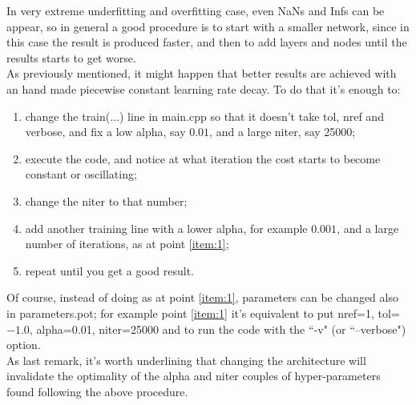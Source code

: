 \documentclass[12pt, a4paper]{report}
\theoremstyle{definition}
\begin{document}
In very extreme underfitting and overfitting case, even NaNs and Infs can be appear, so in general a good procedure is to start with a smaller network, since in this case the result is produced faster, and then to add layers and nodes until the results starts to get worse.\\
\newline\noindent As previously mentioned, it might happen that better results are achieved with an hand made piecewise constant learning rate decay. To do that it's enough to:
\begin{enumerate}
	\item\label{item:1} change the {\ttfamily train(...)} line in main.cpp so that it doesn't take {\ttfamily tol, nref} and {\ttfamily verbose}, and fix a low {\ttfamily alpha}, say $0.01$, and a large {\ttfamily niter}, say 25000;
	\item execute the code, and notice at what iteration the cost starts to become constant or oscillating;
	\item change the {\ttfamily niter} to that number;
	\item add another training line with a lower {\ttfamily alpha}, for example $0.001$, and a large number of iterations, as at point \ref{item:1};
	\item repeat until you get a good result.
\end{enumerate}
Of course, instead of doing as at point \ref{item:1}, parameters can be changed also in parameters.pot; for example point \ref{item:1} it's equivalent to put {\ttfamily nref}=1, {\ttfamily tol}=$-1.0$, {\ttfamily alpha}=0.01, {\ttfamily niter}=25000 and to run the code with the ``{\ttfamily -v}" (or ``{\ttfamily --verbose}") option.\\
As last remark, it's worth underlining that changing the architecture will invalidate the optimality of the {\ttfamily alpha} and {\ttfamily niter} couples of hyper-parameters found following the above procedure.


\end{document}
